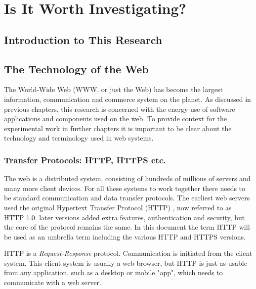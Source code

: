 \chapter{Is It Worth Investigating?}
\label{chapter:worth}

\section{Introduction to This Research}
\label{section:justification introduction}


\section{The Technology of the Web}
\label{section:the technology of the web}

The World-Wide Web (WWW, or just the Web) has become the largest information, communication and commerce system on the planet. As discussed in previous chapters, this research is concerned with the energy use of software applications and components used on the web. To provide context for the experimental work in further chapters it is important to be clear about the technology and terminology used in web systems.

\subsection{Transfer Protocols: HTTP, HTTPS etc.}
The web is a distributed system, consisting of hundreds of millions of servers and many more client devices. For all these systems to work together there needs to be standard communication and data transfer protocols. The earliest web servers used the original Hypertext Transfer Protocol (HTTP) , now referred to as HTTP 1.0. later versions added extra features, authentication and security, but the core of the protocol remains the same. In this document the term HTTP will be used as an umbrella term including the various HTTP and HTTPS versions.

HTTP is a \emph{Request-Response} protocol. Communication is initiated from the client system. This client system is usually a web browser, but HTTP is just as usable from any application, such as a desktop or mobile "app", which needs to communicate with a web server.

